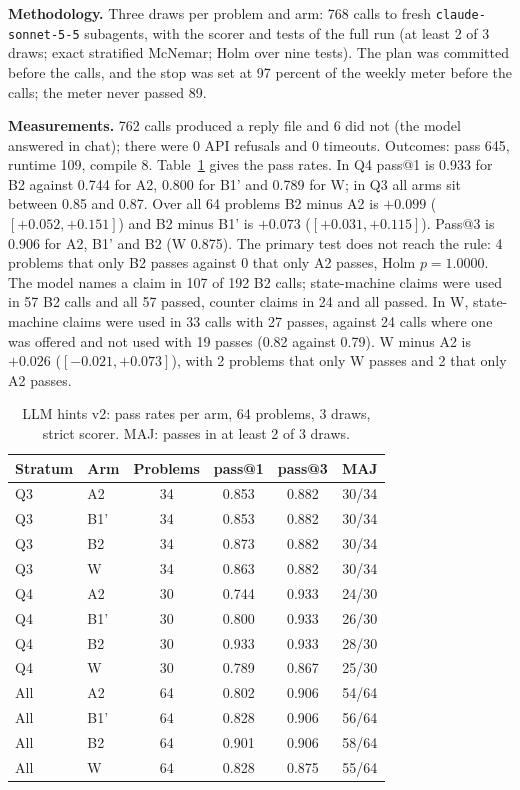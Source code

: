 \documentclass[conference]{IEEEtran}
\newcommand{\hev}[1]{\par\smallskip\noindent\textbf{#1}}
\newcommand{\code}[1]{\texttt{#1}}
\begin{document}
\hev{Methodology.} Three draws per problem and arm: 768 calls to fresh \code{claude-sonnet-5-5} subagents, with the scorer and tests of the full run (at least 2 of 3 draws; exact stratified McNemar; Holm over nine tests). The plan was committed before the calls, and the stop was set at 97 percent of the weekly meter before the calls; the meter never passed 89.

\hev{Measurements.} 762 calls produced a reply file and 6 did not (the model answered in chat); there were 0 API refusals and 0 timeouts. Outcomes: pass 645, runtime 109, compile 8. Table~\ref{tab:llm-hints2} gives the pass rates. In Q4 pass@1 is 0.933 for B2 against 0.744 for A2, 0.800 for B1' and 0.789 for W; in Q3 all arms sit between 0.85 and 0.87. Over all 64 problems B2 minus A2 is $+0.099$ ($[+0.052,+0.151]$) and B2 minus B1' is $+0.073$ ($[+0.031,+0.115]$). Pass@3 is 0.906 for A2, B1' and B2 (W 0.875). The primary test does not reach the rule: 4 problems that only B2 passes against 0 that only A2 passes, Holm $p=1.0000$. The model names a claim in 107 of 192 B2 calls; state-machine claims were used in 57 B2 calls and all 57 passed, counter claims in 24 and all passed. In W, state-machine claims were used in 33 calls with 27 passes, against 24 calls where one was offered and not used with 19 passes (0.82 against 0.79). W minus A2 is $+0.026$ ($[-0.021,+0.073]$), with 2 problems that only W passes and 2 that only A2 passes.

\begin{table}[t]
\centering
\caption{LLM hints v2: pass rates per arm, 64 problems, 3 draws, strict scorer. MAJ: passes in at least 2 of 3 draws.}
\label{tab:llm-hints2}
\small
\begin{tabular}{@{}llcccc@{}}
\toprule
Stratum & Arm & Problems & pass@1 & pass@3 & MAJ \\
\midrule
Q3 & A2 & 34 & 0.853 & 0.882 & 30/34 \\
Q3 & B1' & 34 & 0.853 & 0.882 & 30/34 \\
Q3 & B2 & 34 & 0.873 & 0.882 & 30/34 \\
Q3 & W & 34 & 0.863 & 0.882 & 30/34 \\
Q4 & A2 & 30 & 0.744 & 0.933 & 24/30 \\
Q4 & B1' & 30 & 0.800 & 0.933 & 26/30 \\
Q4 & B2 & 30 & 0.933 & 0.933 & 28/30 \\
Q4 & W & 30 & 0.789 & 0.867 & 25/30 \\
All & A2 & 64 & 0.802 & 0.906 & 54/64 \\
All & B1' & 64 & 0.828 & 0.906 & 56/64 \\
All & B2 & 64 & 0.901 & 0.906 & 58/64 \\
All & W & 64 & 0.828 & 0.875 & 55/64 \\
\bottomrule
\end{tabular}
\end{table}
\end{document}
